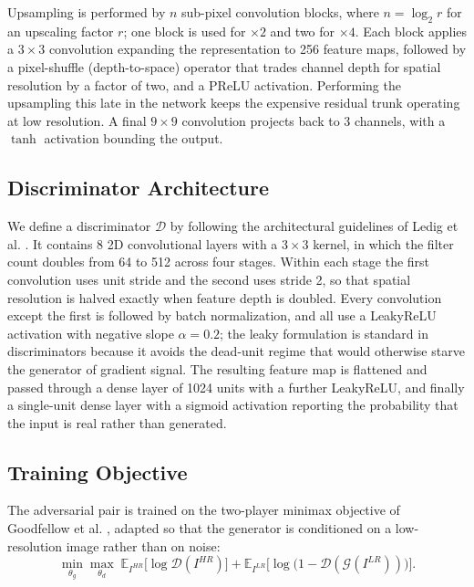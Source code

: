 \documentclass[conference]{IEEEtran}
\begin{document}
Upsampling is performed by $n$ sub-pixel convolution blocks, where $n = \log_2 r$ for an upscaling factor $r$; one block is used for $\times 2$ and two for $\times 4$. Each block applies a $3 \times 3$ convolution expanding the representation to 256 feature maps, followed by a pixel-shuffle (depth-to-space) operator that trades channel depth for spatial resolution by a factor of two, and a PReLU activation. Performing the upsampling this late in the network keeps the expensive residual trunk operating at low resolution. A final $9 \times 9$ convolution projects back to 3 channels, with a $\tanh$ activation bounding the output.


\subsection{Discriminator Architecture}
\label{sec:discriminator}
We define a discriminator $\mathcal{D}$ by following the architectural guidelines of Ledig et al. \cite{ledig2017photo}. It contains $8$ 2D convolutional layers with a $3 \times 3$ kernel, in which the filter count doubles from 64 to 512 across four stages. Within each stage the first convolution uses unit stride and the second uses stride 2, so that spatial resolution is halved exactly when feature depth is doubled. Every convolution except the first is followed by batch normalization, and all use a LeakyReLU activation with negative slope $\alpha = 0.2$; the leaky formulation is standard in discriminators because it avoids the dead-unit regime that would otherwise starve the generator of gradient signal. The resulting feature map is flattened and passed through a dense layer of 1024 units with a further LeakyReLU, and finally a single-unit dense layer with a sigmoid activation reporting the probability that the input is real rather than generated.


\subsection{Training Objective}
The adversarial pair is trained on the two-player minimax objective of Goodfellow et al. \cite{goodfellow2020generative}, adapted so that the generator is conditioned on a low-resolution image rather than on noise:
\begin{equation}
\min_{\theta_g} \max_{\theta_d} \;
\mathbb{E}_{I^{HR}} \big[\log \mathcal{D}(I^{HR})\big] +
\mathbb{E}_{I^{LR}} \big[\log \big(1 - \mathcal{D}(\mathcal{G}(I^{LR}))\big)\big].
\label{eq:minimax}
\end{equation}
\end{document}

